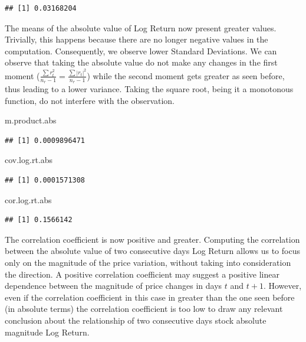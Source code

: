 \documentclass[
]{article}
\newenvironment{Shaded}{\begin{snugshade}}{\end{snugshade}}
\newcommand{\NormalTok}[1]{#1}
\begin{document}
\begin{verbatim}
## [1] 0.03168204
\end{verbatim}

The means of the absolute value of Log Return now present greater
values. Trivially, this happens because there are no longer negative
values in the computation. Consequently, we observe lower Standard
Deviations. We can observe that taking the absolute value do not make
any changes in the first moment
(\(\frac{\sum r_t^2}{n_r-1} = \frac{\sum |r_t|^2}{n_r-1}\)) while the
second moment gets greater as seen before, thus leading to a lower
variance. Taking the square root, being it a monotonous function, do not
interfere with the observation.

\begin{Shaded}
\begin{Highlighting}[]
\NormalTok{m.product.abs}
\end{Highlighting}
\end{Shaded}

\begin{verbatim}
## [1] 0.0009896471
\end{verbatim}

\begin{Shaded}
\begin{Highlighting}[]
\NormalTok{cov.log.rt.abs}
\end{Highlighting}
\end{Shaded}

\begin{verbatim}
## [1] 0.0001571308
\end{verbatim}

\begin{Shaded}
\begin{Highlighting}[]
\NormalTok{cor.log.rt.abs}
\end{Highlighting}
\end{Shaded}

\begin{verbatim}
## [1] 0.1566142
\end{verbatim}

The correlation coefficient is now positive and greater. Computing the
correlation between the absolute value of two consecutive days Log
Return allows us to focus only on the magnitude of the price variation,
without taking into consideration the direction. A positive correlation
coefficient may suggest a positive linear dependence between the
magnitude of price changes in days \(t\) and \(t+1\). However, even if
the correlation coefficient in this case in greater than the one seen
before (in absolute terms) the correlation coefficient is too low to
draw any relevant conclusion about the relationship of two consecutive
days stock absolute magnitude Log Return.
\end{document}
